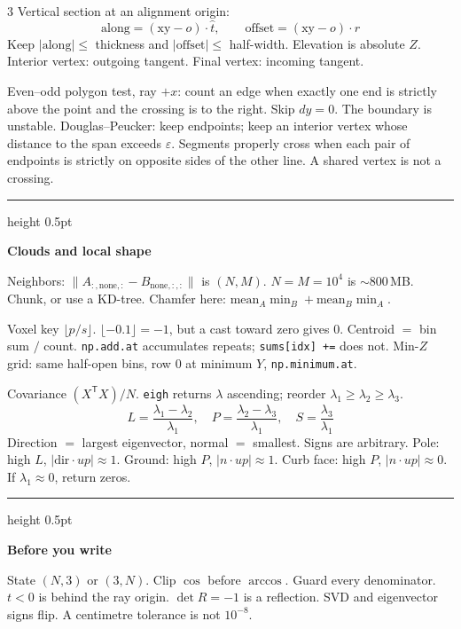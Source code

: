 \documentclass[8pt]{extarticle}
\newcommand{\sect}[1]{%
  \par\vspace{1.5pt}%
  {\color{navy}\hrule height 0.5pt}\par\vspace{0.7pt}%
  {\sffamily\bfseries\color{navy}#1}\par\vspace{0.2pt}%
}
\newcommand{\eps}{\varepsilon}
\begin{document}
\begin{multicols}{3}
Vertical section at an alignment origin:
\[
\mathrm{along}=(\mathrm{xy}-o)\cdot\hat t,\qquad
\mathrm{offset}=(\mathrm{xy}-o)\cdot r
\]
Keep $|\mathrm{along}|\le$ thickness and $|\mathrm{offset}|\le$ half-width. Elevation is absolute $Z$. Interior vertex: outgoing tangent. Final vertex: incoming tangent.

Even--odd polygon test, ray $+x$: count an edge when exactly one end is strictly above the point and the crossing is to the right. Skip $dy=0$. The boundary is unstable.
Douglas--Peucker: keep endpoints; keep an interior vertex whose distance to the span exceeds $\eps$.
Segments properly cross when each pair of endpoints is strictly on opposite sides of the other line. A shared vertex is not a crossing.

\sect{Clouds and local shape}
Neighbors: $\|A_{:,\mathrm{none},:}-B_{\mathrm{none},:,:}\|$ is $(N,M)$. $N=M=10^{4}$ is $\sim$800\,MB. Chunk, or use a KD-tree.
Chamfer here: $\mathrm{mean}_A\min_B+\mathrm{mean}_B\min_A$.

Voxel key $\lfloor p/s\rfloor$. $\lfloor-0.1\rfloor=-1$, but a cast toward zero gives $0$. Centroid $=$ bin sum $/$ count. \texttt{np.add.at} accumulates repeats; \texttt{sums[idx] +=} does not. Min-$Z$ grid: same half-open bins, row 0 at minimum $Y$, \texttt{np.minimum.at}.

Covariance $(X^{\mathsf T}X)/N$. \texttt{eigh} returns $\lambda$ ascending; reorder $\lambda_1\ge\lambda_2\ge\lambda_3$.
\[
L=\frac{\lambda_1-\lambda_2}{\lambda_1},\quad
P=\frac{\lambda_2-\lambda_3}{\lambda_1},\quad
S=\frac{\lambda_3}{\lambda_1}
\]
Direction $=$ largest eigenvector, normal $=$ smallest. Signs are arbitrary. Pole: high $L$, $|\mathrm{dir}\cdot up|\approx 1$. Ground: high $P$, $|n\cdot up|\approx 1$. Curb face: high $P$, $|n\cdot up|\approx 0$. If $\lambda_1\approx 0$, return zeros.

\sect{Before you write}
State $(N,3)$ or $(3,N)$. Clip $\cos$ before $\arccos$. Guard every denominator. $t<0$ is behind the ray origin. $\det R=-1$ is a reflection. SVD and eigenvector signs flip. A centimetre tolerance is not $10^{-8}$.

\end{multicols}
\end{document}
